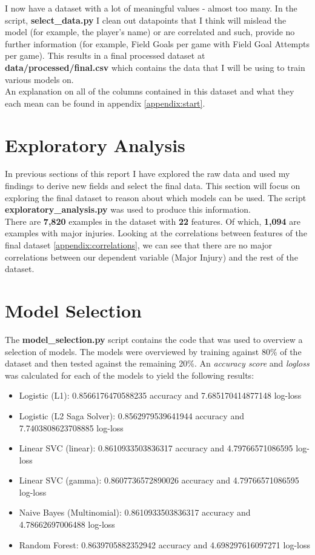 \documentclass{article}
\begin{document}
I now have a dataset with a lot of meaningful values - almost too many. In the script,
\textbf{select\_data.py} I clean out datapoints that I think will mislead the model (for example, the
player's name) or are correlated and such, provide no further information (for example, Field Goals per game with Field
Goal Attempts per game).
This results in a final processed dataset at \textbf{data/processed/final.csv} which contains the
data that I will be using to train various models on.\\

An explanation on all of the columns contained in this dataset and what they each
mean can be found in appendix \ref{appendix:start}.

\section*{Exploratory Analysis}

In previous sections of this report I have explored the raw data and 
used my findings to derive new fields and select the final data.
This section will focus on exploring the final dataset to reason about which
models can be used. The script \textbf{exploratory\_analysis.py} was
used to produce this information.\\

There are \textbf{7,820} examples in the dataset with \textbf{22} features. Of which,
\textbf{1,094} are examples with major injuries. Looking at the correlations between
features of the final dataset \ref{appendix:correlations}, we can see that there are no major 
correlations between our dependent variable (Major Injury) and the 
rest of the dataset.

\section*{Model Selection}

The \textbf{model\_selection.py} script contains the code that 
was used to overview a selection of models. The models were overviewed by 
training against 80\% of the dataset and then tested against the remaining
20\%. An \emph{accuracy score} and \emph{log\-loss} was calculated for each 
of the models to yield the following results:
\begin{itemize}
    \item Logistic (L1): 0.8566176470588235 accuracy and 7.685170414877148 log-loss
    \item Logistic (L2 Saga Solver): 0.8562979539641944 accuracy and 7.7403808623708885 log-loss
    \item Linear SVC (linear): 0.8610933503836317 accuracy and 4.79766571086595 log-loss
    \item Linear SVC (gamma): 0.8607736572890026 accuracy and 4.79766571086595 log-loss
    \item Naive Bayes (Multinomial): 0.8610933503836317 accuracy and 4.78662697006488 log-loss
    \item Random Forest: 0.8639705882352942 accuracy and 4.698297616097271 log-loss
\end{itemize}
\end{document}
